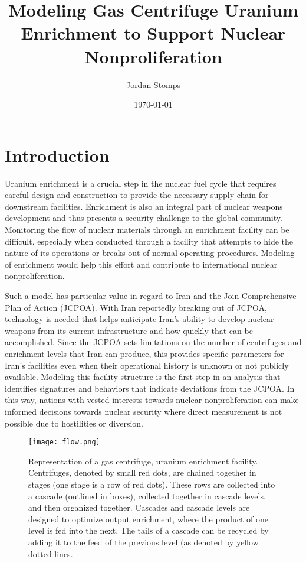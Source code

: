 \documentclass{article}
\title{Modeling Gas Centrifuge Uranium Enrichment to Support Nuclear Nonproliferation}
\author{Jordan Stomps}
\date{\today}
\begin{document}
\maketitle

\section{Introduction}

Uranium enrichment is a crucial step in the nuclear fuel cycle that requires careful design and construction to provide the necessary supply chain for downstream facilities. Enrichment is also an integral part of nuclear weapons development and thus presents a security challenge to the global community. Monitoring the flow of nuclear materials through an enrichment facility can be difficult, especially when conducted through a facility that attempts to hide the nature of its operations or breaks out of normal operating procedures. Modeling of enrichment would help this effort and contribute to international nuclear nonproliferation.

Such a model has particular value in regard to Iran and the Join Comprehensive Plan of Action (JCPOA). With Iran reportedly breaking out of JCPOA, technology is needed that helps anticipate Iran's ability to develop nuclear weapons from its current infrastructure and how quickly that can be accomplished. Since the JCPOA sets limitations on the number of centrifuges and enrichment levels that Iran can produce, this provides specific parameters for Iran’s facilities even when their operational history is unknown or not publicly available. Modeling this facility structure is the first step in an analysis that identifies signatures and behaviors that indicate deviations from the JCPOA. In this way, nations with vested interests towards nuclear nonproliferation can make informed decisions towards nuclear security where direct measurement is not possible due to hostilities or diversion.

\begin{figure}[t!]
    \centering
    \texttt{[image: flow.png]}
    \caption{Representation of a gas centrifuge, uranium enrichment facility. Centrifuges, denoted by small red dots, are chained together in stages (one stage is a row of red dots). These rows are collected into a cascade (outlined in boxes), collected together in cascade levels, and then organized together. Cascades and cascade levels are designed to optimize output enrichment, where the product of one level is fed into the next. The tails of a cascade can be recycled by adding it to the feed of the previous level (as denoted by yellow dotted-lines.}
    \label{fig:cascades}
\end{figure}
\end{document}
